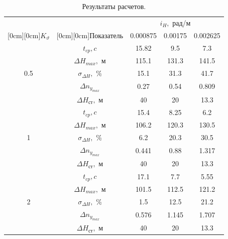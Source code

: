 \documentclass[a4paper,12pt]{article}
\begin{document}
\begin{enumerate}
    
    \begin{table}[H]
        \caption{\label{tab:Результаты расчётов} Результаты расчетов.}
        \begin{center}
            \begin{tabular}{|c|c|c|c|c|}
            \hline
            & \multicolumn{1}{|c|}{} & \multicolumn{3}{|c|}{$i_H,$ рад/м}  \\
            \cline{3-5}
            \raisebox{1.5ex}[0cm][0cm]{$K_{\vartheta}$} & \raisebox{1.5ex}[0cm][0cm]{Показатель}
            & 0.000875 & 0.00175 &0.002625\\
            \hline
            & $t_{cp}, c$ & 15.82 & 9.5 & 7.3\\ 
            \cline{2-5} 
            & $\Delta H_{max},$ м & 115.1 & 131.3 & 141.5\\ 
            \cline{2-5} 
            0.5& $\sigma_{\Delta H},$ \% & 15.1 & 31.3 & 41.7\\ 
            \cline{2-5} 
            & $\Delta n_{y_{max}}$ & 0.27 & 0.54 & 0.809\\ 
            \cline{2-5} 
            & $\Delta H_{\text{ст}},$ м & 40 & 20 & 13.3\\ 
            \hline
            & $t_{cp}, c$ & 15.4 & 8.25 & 6.2\\
            \cline{2-5} 
            & $\Delta H_{max},$ м & 106.2 & 120.3 & 130.5\\ 
            \cline{2-5} 
            1& $\sigma_{\Delta H},$ \% & 6.2 & 20.3 & 30.5\\ 
            \cline{2-5} 
            & $\Delta n_{y_{max}}$ & 0.441 & 0.88 & 1.317\\ 
            \cline{2-5} 
            & $\Delta H_{\text{ст}},$ м & 40 & 20 & 13.3\\
            \hline
            & $t_{cp}, c$ & 17.1 & 7.7 & 5.55\\
            \cline{2-5} 
            & $\Delta H_{max},$ м & 101.5 & 112.5 & 121.2\\ 
            \cline{2-5} 
            2& $\sigma_{\Delta H},$ \% & 1.5 & 12.5 & 21.2\\ 
            \cline{2-5} 
            & $\Delta n_{y_{max}}$ & 0.576 & 1.145 & 1.707\\ 
            \cline{2-5} 
            & $\Delta H_{\text{ст}},$ м & 40 & 20 & 13.3\\ 
            \hline
            \end{tabular}
        \end{center}
    \end{table}


\end{enumerate}
\end{document}
